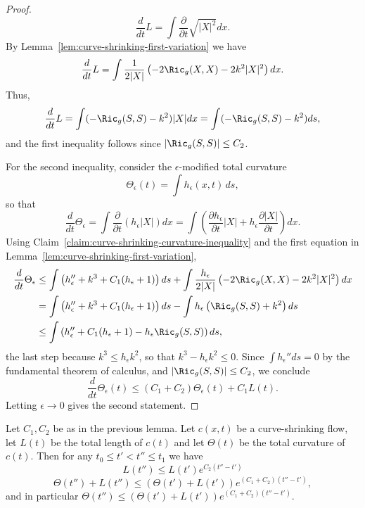 \begin{proof}
$$\frac{d}{dt}L=\int\frac{\partial}{\partial t}\sqrt{|X|^2}dx.$$
By Lemma~\ref{lem:curve-shrinking-first-variation} we have $$\frac{d}{dt}L=\int
\frac{1}{2|X|}\left(-2\Ric_g(X,X)-2k^2|X|^2\right)dx.$$ Thus,
\begin{equation}\label{dLdteqn}\frac{d}{dt}L=\int (-\Ric_g(S,S)-k^2)|X|dx=\int(-\Ric_g(S,S)-k^2)ds,\end{equation}
and the first inequality follows since $|\Ric_g(S,S)|\le C_2$.

For the second inequality, consider the $\epsilon$-modified total curvature
$$\Theta_\epsilon(t)=\int h_\epsilon(x,t)\,ds,$$
so that
$$\frac{d}{dt}\Theta_\epsilon=\int\frac{\partial}{\partial t}(h_\epsilon|X|)dx
=\int\left(\frac{\partial h_\epsilon}{\partial t}|X|+h_\epsilon\frac{\partial |X|}{\partial t}\right)dx.$$
Using Claim~\ref{claim:curve-shrinking-curvature-inequality} and the first
equation in Lemma~\ref{lem:curve-shrinking-first-variation},
\begin{align*}
\frac{d}{dt}\Theta_\epsilon & \le \int\left(h_\epsilon''+k^3+C_1(h_\epsilon+1)\right)ds
+\int\frac{h_\epsilon}{2|X|}\left(-2\Ric_g(X,X)-2k^2|X|^2\right)dx \\
& = \int\left(h_\epsilon''+k^3+C_1(h_\epsilon+1)\right)ds-\int h_\epsilon\left(\Ric_g(S,S)+k^2\right)ds \\
& \le \int\left(h_\epsilon''+C_1(h_\epsilon+1)-h_\epsilon\Ric_g(S,S)\right)ds,
\end{align*}
the last step because $k^3\le h_\epsilon k^2$, so that $k^3-h_\epsilon k^2\le0$.
Since $\int h_\epsilon''ds=0$ by the fundamental theorem of calculus, and
$|\Ric_g(S,S)|\le C_2$, we conclude
$$\frac{d}{dt}\Theta_\epsilon(t)\le (C_1+C_2)\Theta_\epsilon(t)+C_1L(t).$$
Letting $\epsilon\to0$ gives the second statement.
\end{proof}

\begin{corollary}
\label{cor:curve-shrinking-length-curvature-exponential-bound}
\label{lncurvgrowth}
Let $C_1,C_2$ be as in the previous lemma. Let $c(x,t)$ be a curve-shrinking
flow, let $L(t)$ be the total length of $c(t)$ and let $\Theta(t)$ be the total
curvature of $c(t)$. Then for any $t_0\le t'<t''\le t_1$ we have
$$L(t'')\le L(t')e^{C_2(t''-t')}$$
$$\Theta(t'')+L(t'')\le \left(\Theta(t')+L(t')\right)e^{(C_1+C_2)(t''-t')},$$
and in particular $\Theta(t'')\le\left(\Theta(t')+L(t')\right)e^{(C_1+C_2)(t''-t')}$.
\end{corollary}

